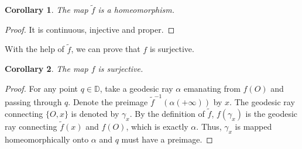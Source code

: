 \documentclass{amsart}
\theoremstyle{plain}
\newtheorem{Corollary}{Corollary}[section]
\theoremstyle{definition}
\theoremstyle{remark}
\begin{document}
% 
\begin{Corollary}
    The map $\tilde{f}$ is a homeomorphism.  
\end{Corollary}
\begin{proof}
    It is continuous, injective and proper.  
\end{proof}
% 
With the help of $\tilde{f}$, we can prove that $f$ is surjective.  
\begin{Corollary}
    The map $f$ is surjective.  
\end{Corollary}
\begin{proof}
    For any point $q \in \mathbb{D}$, take a geodesic ray $\alpha$ emanating from $f(O)$ and passing through $q$.  Denote the preimage $\tilde{f}^{-1}(\alpha(+\infty))$ by $x$.  The geodesic ray connecting $\{O, x\}$ is denoted by $\gamma_x$.  By the definition of $\tilde{f}$, $f(\gamma_x)$ is the geodesic ray connecting $\tilde{f}(x)$ and $f(O)$, which is exactly $\alpha$.  Thus, $\gamma_x$ is mapped homeomorphically onto $\alpha$ and $q$ must have a preimage.  
\end{proof}
% 
\end{document}
